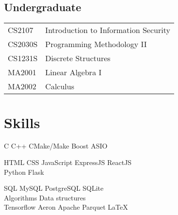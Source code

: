 \documentclass[a4paper,hidelinks]{resume} %
\begin{document}
\begin{minipage}[t]{0.44\textwidth}
    \subsection{Undergraduate}
    
    \begin{tabular}{ll}
        CS2107 & Introduction to Information Security \\
        CS2030S & Programming Methodology II \\
        CS1231S & Discrete Structures \\
        MA2001 & Linear Algebra I \\
        MA2002 & Calculus \\
    \end{tabular}
    
    \sectionspace %
    
    
    \section{Skills}
    
    \sectionspace %
    
    
    C \textbullet{} C++ \textbullet{} CMake/Make \textbullet{} Boost \textbullet{} ASIO \\
    
    
    HTML \textbullet{} CSS \textbullet{} JavaScript \textbullet{} ExpressJS \textbullet{} ReactJS \\ \textbullet{} Python \textbullet{} Flask\\
    
    
    SQL \textbullet{} MySQL \textbullet{} PostgreSQL \textbullet{} SQLite \\
    
    Algorithms \textbullet{}Data structures\\
    
    Tensorflow \textbullet{} Aeron \textbullet{} Apache Parquet \textbullet{}\LaTeX\ \\
    

\end{minipage}
\end{document}
